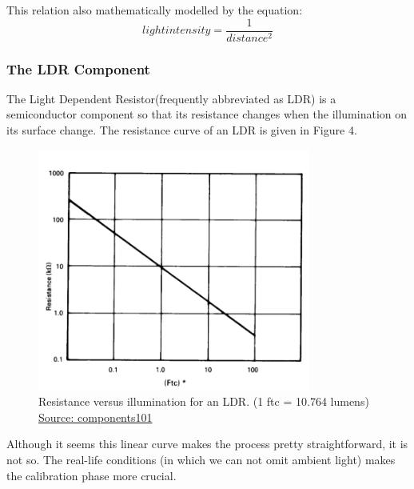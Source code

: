 \documentclass[letterpaper,12pt]{article}
\begin{document}
This relation also mathematically modelled by the equation:
\[light intensity  = \frac{1}{distance^2}\]
\subsubsection{The LDR Component}
The Light Dependent Resistor(frequently abbreviated as LDR) is a semiconductor component so that its resistance changes when the illumination on its surface change. The resistance curve of an LDR is given in Figure 4.
\begin{figure}[H]
	\centering
   \includegraphics[width=0.8\textwidth]{resistance-illum.png}
   \caption{Resistance versus illumination for an LDR. (1 ftc = 10.764 lumens) \hyperref[sec:ref]{Source: components101}}
\end{figure} 
Although it seems this linear curve makes the process pretty straightforward, it is not so. The real-life conditions (in which we can not omit ambient light) makes the calibration phase more crucial.
\end{document}
